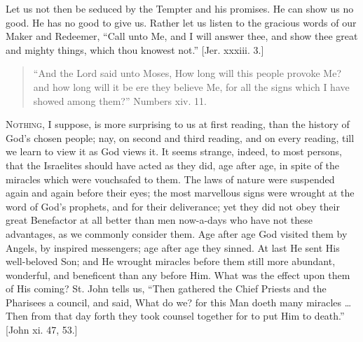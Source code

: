 Let us not then be seduced by the Tempter and his promises. He can
show us no good. He has no good to give us. Rather let us listen to
the gracious words of our Maker and Redeemer, ``Call unto Me, and
I will answer thee, and show thee great and mighty things, which thou
knowest not.'' [Jer. xxxiii. 3.]


\begin{quote}

``And the Lord said unto Moses, How long will this people
provoke Me? and how long will it be ere they believe Me, for all the
signs which I have showed among them?'' Numbers xiv. 11.

\end{quote}

N\textsc{othing}, I suppose, is more surprising to us at first reading, than
the history of God's chosen people; nay, on second and third reading,
and on every reading, till we learn to view it as God views it. It
seems strange, indeed, to most persons, that the Israelites should
have acted as they did, age after age, in spite of the miracles which
were vouchsafed to them. The laws of nature were suspended again and
again before their eyes; the most marvellous signs were wrought at the
word of God's prophets, and for their deliverance; yet they did not
obey their great Benefactor at all better than men now-a-days who have
not these advantages, as we commonly consider them. Age after age God
visited them by Angels, by inspired messengers; age after age they
sinned. At last He sent His well-beloved Son; and He wrought miracles
before them still more abundant, wonderful, and beneficent than any
before Him. What was the effect upon them of His coming? St. John
tells us, ``Then gathered the Chief Priests and the Pharisees a
council, and said, What do we? for this Man doeth many miracles …
Then from that day forth they took counsel together for to put Him to
death.'' [John xi. 47, 53.]

